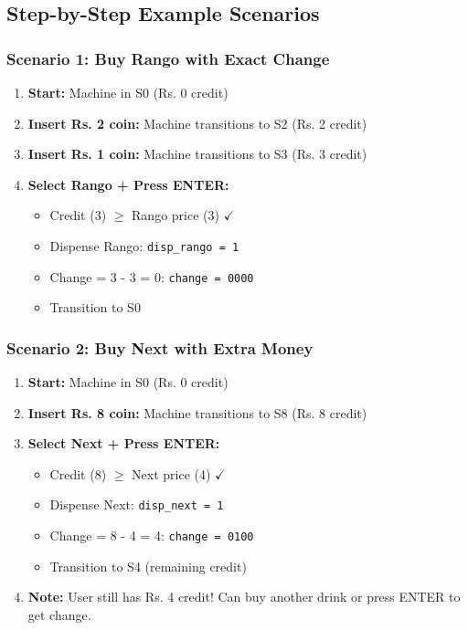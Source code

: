 \documentclass[12pt,a4paper]{article}
\begin{document}
\subsection{Step-by-Step Example Scenarios}

\subsubsection{Scenario 1: Buy Rango with Exact Change}
\begin{enumerate}
    \item \textbf{Start:} Machine in S0 (Rs. 0 credit)
    \item \textbf{Insert Rs. 2 coin:} Machine transitions to S2 (Rs. 2 credit)
    \item \textbf{Insert Rs. 1 coin:} Machine transitions to S3 (Rs. 3 credit)
    \item \textbf{Select Rango + Press ENTER:}
    \begin{itemize}
        \item Credit (3) $\geq$ Rango price (3) $\checkmark$
        \item Dispense Rango: \texttt{disp\_rango = 1}
        \item Change = 3 - 3 = 0: \texttt{change = 0000}
        \item Transition to S0
    \end{itemize}
\end{enumerate}

\subsubsection{Scenario 2: Buy Next with Extra Money}
\begin{enumerate}
    \item \textbf{Start:} Machine in S0 (Rs. 0 credit)
    \item \textbf{Insert Rs. 8 coin:} Machine transitions to S8 (Rs. 8 credit)
    \item \textbf{Select Next + Press ENTER:}
    \begin{itemize}
        \item Credit (8) $\geq$ Next price (4) $\checkmark$
        \item Dispense Next: \texttt{disp\_next = 1}
        \item Change = 8 - 4 = 4: \texttt{change = 0100}
        \item Transition to S4 (remaining credit)
    \end{itemize}
    \item \textbf{Note:} User still has Rs. 4 credit! Can buy another drink or press ENTER to get change.
\end{enumerate}
\end{document}
